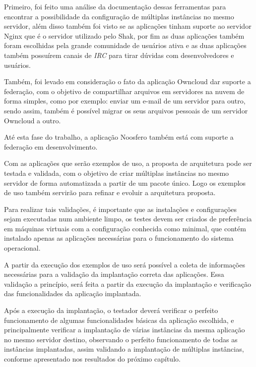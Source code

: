 Primeiro, foi feito uma análise da documentação dessas ferramentas para encontrar a
possibilidade da configuração de múltiplas instâncias no mesmo servidor, além
disso também foi visto se as aplicações tinham suporte ao servidor Nginx que é
o servidor utilizado pelo Shak, por fim as duas aplicações também foram escolhidas
pela grande comunidade de usuários ativa e as duas aplicações também possuírem
canais de \textit{IRC} para tirar dúvidas com desenvolvedores e usuários. 

Também, foi levado em consideração o fato da  aplicação Owncloud dar suporte a federação,
com  o objetivo de compartilhar arquivos em servidores na nuvem de forma simples,
como por exemplo: enviar um e-mail de um servidor para outro, sendo assim,
também é possível migrar os seus arquivos pessoais de um servidor Owncloud a outro.

Até esta fase do trabalho, a aplicação Noosfero também está com suporte a 
federação em desenvolvimento.

Com as aplicações que serão exemplos de uso, a proposta de arquitetura
pode ser testada e validada, com o objetivo de criar múltiplas instâncias
no mesmo servidor de forma automatizada a partir de um pacote único. Logo os
exemplos de uso também servirão para refinar e evoluir a arquitetura proposta.

Para realizar tais validações, é importante que as instalações e configurações
sejam executadas num ambiente limpo, os testes devem ser criados de preferência
em máquinas virtuais com a configuração conhecida como minimal, que contém
instalado apenas as aplicações necessárias para o funcionamento do sistema operacional.

A partir da execução dos exemplos de uso será possível a coleta de informações
necessárias para a validação da implantação correta das aplicações. Essa
validação a princípio, será feita a partir da execução da implantação e
verificação das funcionalidades da aplicação implantada.

Após a execução da implantação, o testador deverá verificar o perfeito
funcionamento de algumas funcionalidades básicas da aplicação escolhida,
e principalmente verificar a implantação de várias instâncias da mesma
aplicação no mesmo servidor destino, observando o perfeito funcionamento de todas as
instâncias implantadas, assim validando a implantação de múltiplas instâncias, conforme
apresentado nos resultados do próximo capítulo.

